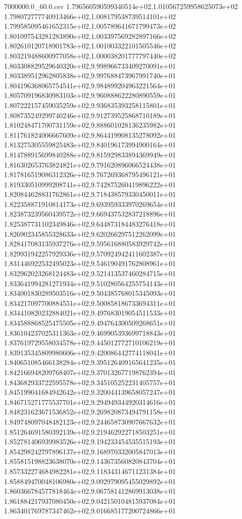 \begin{filecontents*}{7000000.0_60.0.csv}
1.796560590599340514e+02,1.010567259958625073e+02
1.798072777740913466e+02,1.008179538739514101e+02
1.799585095461652315e+02,1.005789641671799473e+02
1.801097543281283890e+02,1.003397569282897166e+02
1.802610120718901783e+02,1.001003322101505546e+02
1.803219488600977058e+02,1.000038201777797440e+02
1.803308829529640320e+02,9.998966733409270091e+01
1.803389512962805838e+02,9.997688473967991740e+01
1.804196368065754541e+02,9.984899204963221564e+01
1.805709196830983103e+02,9.960888622280890559e+01
1.807222157459035259e+02,9.936835393258115801e+01
1.808735249299740246e+02,9.912739525868710189e+01
1.810248471700731159e+02,9.888601028136235982e+01
1.811761824006667609e+02,9.864419908135278092e+01
1.813275305559825483e+02,9.840196173994900164e+01
1.814788915699840288e+02,9.815929833894369949e+01
1.816302653763824821e+02,9.791620896066524438e+01
1.817816519086312326e+02,9.767269368795496121e+01
1.819330510999208741e+02,9.742875260419896222e+01
1.820844628831762861e+02,9.718438579330450011e+01
1.822358871910814173e+02,9.693959333970269654e+01
1.823873239560439572e+02,9.669437532837218896e+01
1.825387731102349846e+02,9.644873184483276418e+01
1.826902345855328633e+02,9.620266297512262099e+01
1.828417083135937276e+02,9.595616880583929742e+01
1.829931942257929336e+02,9.570924942411602387e+01
1.831446922532495023e+02,9.546190491762808961e+01
1.832962023268124483e+02,9.521413537460284715e+01
1.833641994281271934e+02,9.510280564255754143e+01
1.834001830289503516e+02,9.504385768015345093e+01
1.834217097700884551e+02,9.500858186733694311e+01
1.834410820232884021e+02,9.497683019054511533e+01
1.834588868525475505e+02,9.494764300509268651e+01
1.836104237025311363e+02,9.469905393699718843e+01
1.837619729558034578e+02,9.445012772710106219e+01
1.839135345809980606e+02,9.420086442774118041e+01
1.840651085466138284e+02,9.395126409165641235e+01
1.842166948209768407e+02,9.370132677198762394e+01
1.843682933722595578e+02,9.345105252231405757e+01
1.845199041684942642e+02,9.320044139658057247e+01
1.846715271775537701e+02,9.294949344920314616e+01
1.848231623671536852e+02,9.269820873494791158e+01
1.849748097048482123e+02,9.244658730907667632e+01
1.851264691580392139e+02,9.219462922718503251e+01
1.852781406939983526e+02,9.194233454535515193e+01
1.854298242797896137e+02,9.168970332005847013e+01
1.855815198823638070e+02,9.143673560820843704e+01
1.857332274684982281e+02,9.118343146711231384e+01
1.858849470048106980e+02,9.092979095455029892e+01
1.860366784577818464e+02,9.067581412869913038e+01
1.861884217937080450e+02,9.042150104815937084e+01
1.863401769787347462e+02,9.016685177200724866e+01

\end{filecontents*}
